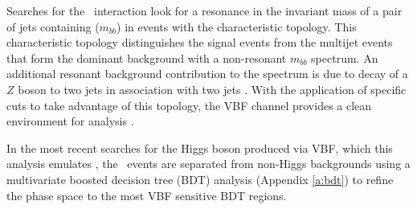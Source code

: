 		Searches for the \VBFHBB\, interaction look for a resonance in the invariant mass of a pair of jets containing \bquarks ($m_{bb}$) in events with the characteristic topology. This characteristic topology distinguishes the signal events from the multijet events that form the dominant background with a non-resonant $m_{bb}$ spectrum. An additional resonant background contribution to the \mbb spectrum is due to decay of a $Z$ boson to two jets in association with two jets \cite{VBFHbb8tev}. With the application of specific cuts to take advantage of this topology, the VBF channel provides a clean environment for analysis \cite{pdghiggs}.

		In the most recent searches for the Higgs boson produced via VBF, which this analysis emulates \cite{VBFHbb8tev}, the \VBFHBB\, events are separated from non-Higgs backgrounds using a multivariate boosted decision tree (BDT) analysis (Appendix \ref{a:bdt}) to refine the phase space to the most VBF sensitive BDT regions.


\endinput
